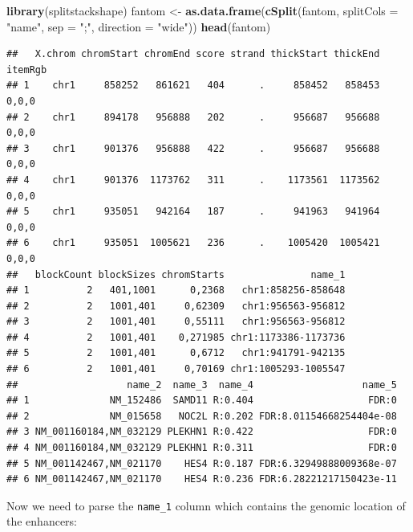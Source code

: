 \documentclass[9pt,a4paper,]{extarticle}
\newenvironment{Shaded}{\begin{snugshade}}{\end{snugshade}}
\newcommand{\KeywordTok}[1]{\textcolor[rgb]{0.13,0.29,0.53}{\textbf{#1}}}
\newcommand{\DataTypeTok}[1]{\textcolor[rgb]{0.13,0.29,0.53}{#1}}
\newcommand{\StringTok}[1]{\textcolor[rgb]{0.31,0.60,0.02}{#1}}
\newcommand{\NormalTok}[1]{#1}
\begin{document}
\begin{Shaded}
\begin{Highlighting}[]
\KeywordTok{library}\NormalTok{(splitstackshape)}
\NormalTok{fantom <-}\StringTok{ }\KeywordTok{as.data.frame}\NormalTok{(}\KeywordTok{cSplit}\NormalTok{(fantom, }\DataTypeTok{splitCols =} \StringTok{"name"}\NormalTok{, }\DataTypeTok{sep =} \StringTok{";"}\NormalTok{, }\DataTypeTok{direction =} \StringTok{"wide"}\NormalTok{))}
\KeywordTok{head}\NormalTok{(fantom)}
\end{Highlighting}
\end{Shaded}

\begin{verbatim}
##   X.chrom chromStart chromEnd score strand thickStart thickEnd itemRgb
## 1    chr1     858252   861621   404      .     858452   858453   0,0,0
## 2    chr1     894178   956888   202      .     956687   956688   0,0,0
## 3    chr1     901376   956888   422      .     956687   956688   0,0,0
## 4    chr1     901376  1173762   311      .    1173561  1173562   0,0,0
## 5    chr1     935051   942164   187      .     941963   941964   0,0,0
## 6    chr1     935051  1005621   236      .    1005420  1005421   0,0,0
##   blockCount blockSizes chromStarts               name_1
## 1          2   401,1001      0,2368   chr1:858256-858648
## 2          2   1001,401     0,62309   chr1:956563-956812
## 3          2   1001,401     0,55111   chr1:956563-956812
## 4          2   1001,401    0,271985 chr1:1173386-1173736
## 5          2   1001,401      0,6712   chr1:941791-942135
## 6          2   1001,401     0,70169 chr1:1005293-1005547
##                   name_2  name_3  name_4                   name_5
## 1              NM_152486  SAMD11 R:0.404                    FDR:0
## 2              NM_015658   NOC2L R:0.202 FDR:8.01154668254404e-08
## 3 NM_001160184,NM_032129 PLEKHN1 R:0.422                    FDR:0
## 4 NM_001160184,NM_032129 PLEKHN1 R:0.311                    FDR:0
## 5 NM_001142467,NM_021170    HES4 R:0.187 FDR:6.32949888009368e-07
## 6 NM_001142467,NM_021170    HES4 R:0.236 FDR:6.28221217150423e-11
\end{verbatim}

Now we need to parse the \texttt{name\_1} column which contains the genomic location of the enhancers:
\end{document}
